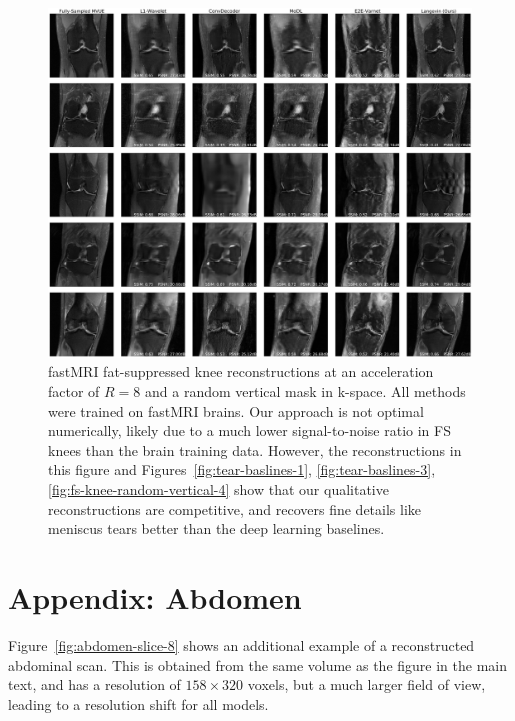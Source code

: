 \begin{figure}
    \centering
    \includegraphics[width=\columnwidth]{fs-random-vertical-R=8-comp.pdf}
    \caption{\small fastMRI fat-suppressed knee reconstructions at an acceleration factor of $R=8$ and a random vertical mask in k-space. All methods were trained on fastMRI brains. Our approach is not optimal numerically, likely due to a much lower signal-to-noise ratio in FS knees than the brain training data. However, the reconstructions in this figure and Figures~\ref{fig:tear-baslines-1}, \ref{fig:tear-baslines-3}, \ref{fig:fs-knee-random-vertical-4} show that our qualitative reconstructions are competitive, and recovers fine details like meniscus tears better than the deep learning baselines.}
    \label{fig:fs-knee-random-vertical-8}
\end{figure}




\clearpage

\section{Appendix: Abdomen}\label{app:abdomens}
Figure~\ref{fig:abdomen-slice-8} shows an additional example of a reconstructed abdominal scan. This is obtained from the same volume as the figure in the main text, and has a resolution of $158 \times 320$ voxels, but a much larger field of view, leading to a resolution shift for all models.

